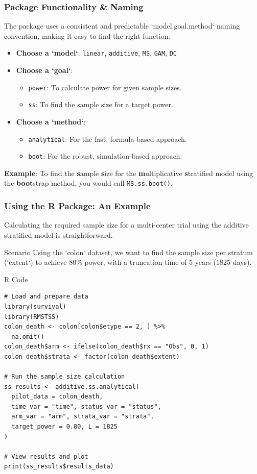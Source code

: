 \documentclass{beamer}
\begin{document}
\begin{frame}
\frametitle{Package Functionality \& Naming}
The package uses a consistent and predictable `model.goal.method` naming convention, making it easy to find the right function.
\begin{itemize}
    \item \textbf{Choose a `model`}: \texttt{linear}, \texttt{additive}, \texttt{MS}, \texttt{GAM}, \texttt{DC}
    \item \textbf{Choose a `goal`}:
    \begin{itemize}
        \item \texttt{power}: To calculate power for given sample sizes.
        \item \texttt{ss}: To find the sample size for a target power.
    \end{itemize}
    \item \textbf{Choose a `method`}:
    \begin{itemize}
        \item \texttt{analytical}: For the fast, formula-based approach.
        \item \texttt{boot}: For the robust, simulation-based approach.
    \end{itemize}
\end{itemize}
\vspace{1em}
\textbf{Example}: To find the \textbf{s}ample \textbf{s}ize for the \textbf{m}ultiplicative \textbf{s}tratified model using the \textbf{boot}strap method, you would call \texttt{MS.ss.boot()}.
\end{frame}

\begin{frame}[fragile]
\frametitle{Using the R Package: An Example}
Calculating the required sample size for a multi-center trial using the additive stratified model is straightforward.

\begin{block}{Scenario}
Using the `colon` dataset, we want to find the sample size per stratum (`extent`) to achieve 80\% power, with a truncation time of 5 years (1825 days).
\end{block}

\begin{block}{R Code}
\begin{verbatim}
# Load and prepare data
library(survival)
library(RMSTSS)
colon_death <- colon[colon$etype == 2, ] %>% 
  na.omit()
colon_death$arm <- ifelse(colon_death$rx == "Obs", 0, 1)
colon_death$strata <- factor(colon_death$extent)

# Run the sample size calculation
ss_results <- additive.ss.analytical(
  pilot_data = colon_death,
  time_var = "time", status_var = "status", 
  arm_var = "arm", strata_var = "strata", 
  target_power = 0.80, L = 1825
)

# View results and plot
print(ss_results$results_data)
\end{verbatim}
\end{block}
\end{frame}
\end{document}
